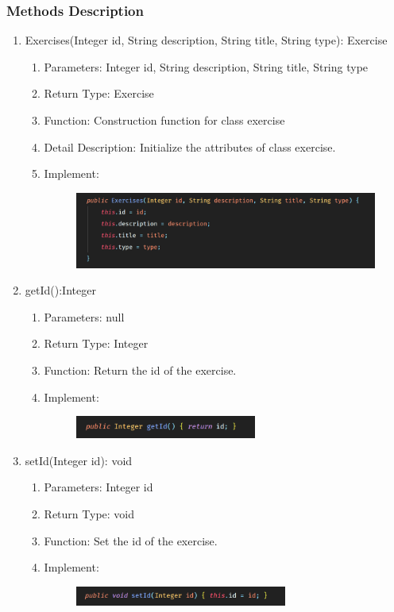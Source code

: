 \documentclass[16pt]{scrreprt}
\begin{document}
\subsubsection{Methods Description}
\begin{enumerate}
	\item Exercises(Integer id, String description, String title, String type): Exercise
	\begin{enumerate}
		\item Parameters: Integer id, String description, String title, String type
		\item Return Type: Exercise
		\item Function: Construction function for class exercise
		\item Detail Description: Initialize the attributes of class exercise.
		\item Implement:
		\begin{figure}[H]
	\centering
	\includegraphics[width=1.\textwidth]{diagrams/exercisefunc.png}\\
\end{figure}
	\end{enumerate}
	\item getId():Integer 
	\begin{enumerate}
		\item Parameters: null
		\item Return Type: Integer
		\item Function: Return the id of the exercise.
		\item Implement:
		\begin{figure}[H]
	\centering
	\includegraphics[width=0.6\textwidth]{diagrams/ex-getid.png}\\
\end{figure}
	\end{enumerate}
	\item setId(Integer id): void
	\begin{enumerate}
		\item Parameters: Integer id
		\item Return Type: void
		\item Function: Set the id of the exercise.
		\item Implement:
		\begin{figure}[H]
	\centering
	\includegraphics[width=0.7\textwidth]{diagrams/ex-setid.png}\\
\end{figure}
\end{enumerate}


\end{enumerate}
\end{document}
